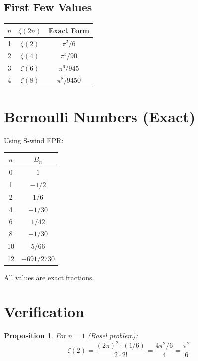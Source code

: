 \documentclass[11pt,a4paper]{article}
\newtheorem{proposition}{Proposition}
\begin{document}
\subsection{First Few Values}

\begin{center}
\begin{tabular}{|c|c|c|}
\hline
$n$ & $\zeta(2n)$ & Exact Form \\
\hline
1 & $\zeta(2)$ & $\pi^2/6$ \\
2 & $\zeta(4)$ & $\pi^4/90$ \\
3 & $\zeta(6)$ & $\pi^6/945$ \\
4 & $\zeta(8)$ & $\pi^8/9450$ \\
\hline
\end{tabular}
\end{center}

\section{Bernoulli Numbers (Exact)}

Using S-wind EPR:

\begin{center}
\begin{tabular}{|c|c|}
\hline
$n$ & $B_n$ \\
\hline
0 & $1$ \\
1 & $-1/2$ \\
2 & $1/6$ \\
4 & $-1/30$ \\
6 & $1/42$ \\
8 & $-1/30$ \\
10 & $5/66$ \\
12 & $-691/2730$ \\
\hline
\end{tabular}
\end{center}

All values are exact fractions.

\section{Verification}

\begin{proposition}
For $n = 1$ (Basel problem):
\begin{equation}
\zeta(2) = \frac{(2\pi)^2 \cdot (1/6)}{2 \cdot 2!} = \frac{4\pi^2 / 6}{4} = \frac{\pi^2}{6}
\end{equation}
\end{proposition}
\end{document}
